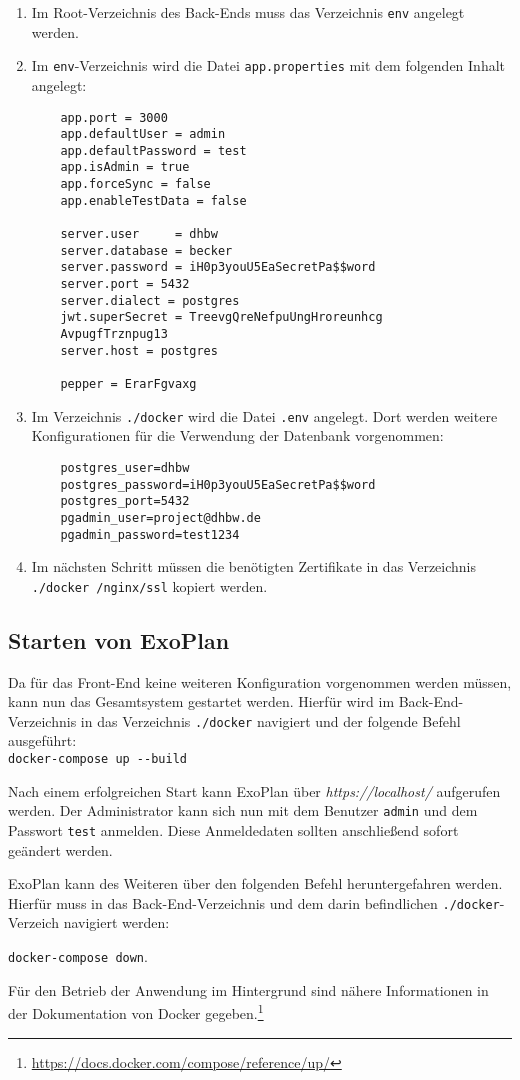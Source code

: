 \begin{enumerate}
	\item Im Root-Verzeichnis des Back-Ends muss das Verzeichnis \texttt{env} angelegt werden.
	\item Im \texttt{env}-Verzeichnis wird die Datei \texttt{app.properties} mit dem folgenden Inhalt angelegt:
	\begin{lstlisting}
	app.port = 3000
	app.defaultUser = admin
	app.defaultPassword = test
	app.isAdmin = true
	app.forceSync = false
	app.enableTestData = false
	
	server.user     = dhbw
	server.database = becker
	server.password = iH0p3youU5EaSecretPa$$word
	server.port = 5432
	server.dialect = postgres
	jwt.superSecret = TreevgQreNefpuUngHroreunhcg
	AvpugfTrznpug13
	server.host = postgres
	
	pepper = ErarFgvaxg
	\end{lstlisting}
	
	\item Im Verzeichnis \texttt{./docker} wird die Datei \texttt{.env} angelegt. Dort werden weitere Konfigurationen für die Verwendung der Datenbank vorgenommen:
	
	\begin{lstlisting}
	postgres_user=dhbw
	postgres_password=iH0p3youU5EaSecretPa$$word
	postgres_port=5432
	pgadmin_user=project@dhbw.de
	pgadmin_password=test1234
	\end{lstlisting}
	
	\item Im nächsten Schritt müssen die benötigten Zertifikate in das Verzeichnis \texttt{./docker
		/nginx/ssl} kopiert werden.
	
\end{enumerate}

\subsection{Starten von ExoPlan}

Da für das Front-End keine weiteren Konfiguration vorgenommen werden müssen, kann nun das Gesamtsystem gestartet werden. 
Hierfür wird im Back-End-Verzeichnis in das Verzeichnis \texttt{./docker} navigiert und der folgende Befehl ausgeführt:\\ 
\texttt{docker-compose up -{}-build}

Nach einem erfolgreichen Start kann ExoPlan über \textit{https://localhost/} aufgerufen werden. 
Der Administrator kann sich nun mit dem Benutzer \texttt{admin} und dem Passwort \texttt{test} anmelden. Diese Anmeldedaten sollten anschließend sofort geändert werden.

ExoPlan kann des Weiteren über den folgenden Befehl heruntergefahren werden. 
Hierfür muss in das Back-End-Verzeichnis und dem darin befindlichen \texttt{./docker}-Verzeich navigiert werden:

\texttt{docker-compose down}.

Für den Betrieb der Anwendung im Hintergrund sind nähere Informationen in der Dokumentation von Docker gegeben.\footnote{\url{https://docs.docker.com/compose/reference/up/}}